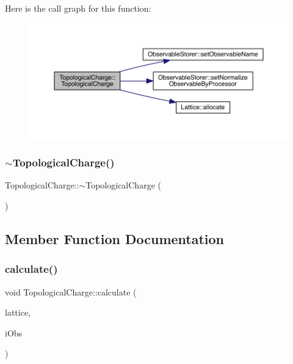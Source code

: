 Here is the call graph for this function\+:\nopagebreak
\begin{figure}[H]
\begin{center}
\leavevmode
\includegraphics[width=350pt]{class_topological_charge_a415e32f865f7b5c83f4ac4471838d514_cgraph}
\end{center}
\end{figure}
\mbox{\label{class_topological_charge_aec647c5c45f8532639cebcac10865f2e}} 
\subsubsection{\texorpdfstring{$\sim$TopologicalCharge()}{~TopologicalCharge()}}
{\footnotesize\ttfamily Topological\+Charge\+::$\sim$\+Topological\+Charge (\begin{DoxyParamCaption}{ }\end{DoxyParamCaption})}



\subsection{Member Function Documentation}
\mbox{\label{class_topological_charge_a8ed78c28c3484df04b1cb24187de2f5b}} 
\subsubsection{\texorpdfstring{calculate()}{calculate()}}
{\footnotesize\ttfamily void Topological\+Charge\+::calculate (\begin{DoxyParamCaption}\item[{\mbox{\hyperlink{class_lattice}{Lattice}}$<$ \mbox{\hyperlink{class_s_u3}{S\+U3}} $>$ $\ast$}]{lattice,  }\item[{unsigned int}]{i\+Obs }\end{DoxyParamCaption})\hspace{0.3cm}{\ttfamily [virtual]}}



